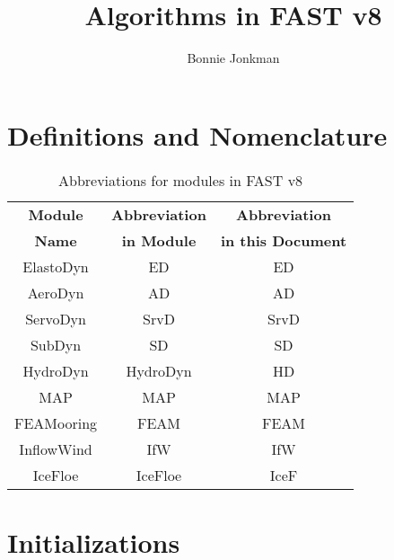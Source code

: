 \documentclass[10pt,letterpaper,oneside,notitlepage]{article}
\begin{document}
\title{Algorithms in FAST v8}
\author{Bonnie Jonkman}
\maketitle


\section{Definitions and Nomenclature}


\begin{table}[h]
	\centering
		\begin{tabular}{c|c|c}
		\textbf{Module} & \textbf{Abbreviation} & \textbf{Abbreviation}\\
		\textbf{Name}   & \textbf{in Module}    & \textbf{in this Document}\\
		\hline 
		ElastoDyn       & ED                    & ED        \\
		AeroDyn         & AD                    & AD        \\
		ServoDyn        & SrvD                  & SrvD      \\
		SubDyn          & SD                    & SD        \\
		HydroDyn        & HydroDyn              & HD        \\
		MAP             & MAP                   & MAP       \\
		FEAMooring      & FEAM                  & FEAM      \\
		InflowWind      & IfW                   & IfW       \\   
		IceFloe         & IceFloe               & IceF      \\   
		\end{tabular}
	\caption{Abbreviations for modules in FAST v8}
	\label{tab:Abbrev}
\end{table}


\printnomenclature

\section{Initializations}


\pagebreak %
\end{document}
